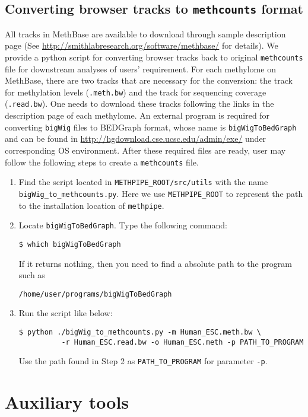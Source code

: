 \documentclass[10pt]{article}
\newcommand{\meth}{\texttt{methpipe}}
\newcommand{\prog}[1]{\texttt{#1}}
\begin{document}
{{\subsection{Converting browser tracks to \prog{methcounts} format}
All tracks in MethBase are available to download through sample description
page (See \url{http://smithlabresearch.org/software/methbase/} for details). 
We provide a python script for converting browser tracks back to original
\texttt{methcounts} file for downstream analyses of users' requirement. For
each methylome on MethBase, there are two tracks that are necessary for
the conversion: the track for methylation levels (\texttt{.meth.bw}) and
the track for sequencing coverage (\texttt{.read.bw}). One needs to download
these tracks following the links in the description page of each methylome.
An external program is required for converting \texttt{bigWig} files to
BEDGraph format, whose name is \texttt{bigWigToBedGraph} and can be found
in \url{http://hgdownload.cse.ucsc.edu/admin/exe/} under corresponding
OS environment. After these required files are ready, user may follow the
following steps to create a \texttt{methcounts} file.

\begin{enumerate}
\item Find the script located in \texttt{METHPIPE\_ROOT/src/utils} with the
name \texttt{bigWig\_to\_methcounts.py}. Here we use
\texttt{METHPIPE\_ROOT} to represent the path to the installation location
of \meth.
\item Locate \texttt{bigWigToBedGraph}. Type the following command:
\begin{verbatim}
$ which bigWigToBedGraph
\end{verbatim}
If it returns nothing, then you need to find a absolute path to the 
program such as
\begin{verbatim}
/home/user/programs/bigWigToBedGraph
\end{verbatim}
\item Run the script like below:
\begin{verbatim}
$ python ./bigWig_to_methcounts.py -m Human_ESC.meth.bw \
          -r Human_ESC.read.bw -o Human_ESC.meth -p PATH_TO_PROGRAM
\end{verbatim}
Use the path found in Step 2 as \texttt{PATH\_TO\_PROGRAM} for parameter
\texttt{-p}.

\end{enumerate}


\section{Auxiliary tools}
\label{sec:auxiliary-tools}

}}
\end{document}
